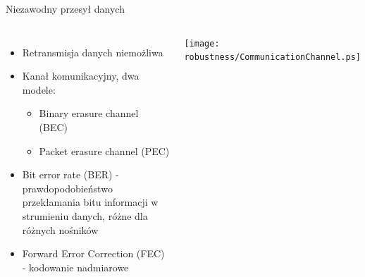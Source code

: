 \documentclass[compress,red]{beamer}
\begin{document}
\begin{frame}{Niezawodny przesył danych}

  \begin{columns}[c]

      \begin{itemize}
	\item Retransmisja danych niemożliwa
	\item Kanał komunikacyjny, dwa modele:
	\begin{itemize}
	  \item Binary erasure channel (BEC)
	  \item Packet erasure channel (PEC)
	\end{itemize}
	\item Bit error rate (BER) - prawdopodobieństwo przekłamania bitu informacji w strumieniu danych, 
	      różne dla różnych nośników
	\item Forward Error Correction (FEC) - kodowanie nadmiarowe
      \end{itemize}

      \vspace{2cm}


      \begin{center}
      \texttt{[image: robustness/CommunicationChannel.ps]}
      \end{center}

      \vspace{2cm}

  \end{columns}

\end{frame}
\end{document}

